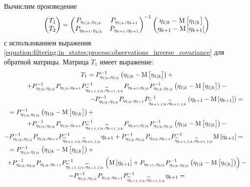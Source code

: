 Вычислим произведение
$$
	\begin{pmatrix}
		T_1 \\
		T_2
	\end{pmatrix}
	=
	\begin{pmatrix}
		P_{\eta_{1|k}, \eta_{1|k}} & P_{\eta_{1|k}, \eta_{k+1}} \\
		P_{\eta_{k+1}, \eta_{1|k}} & P_{\eta_{k+1}, \eta_{k+1}}
	\end{pmatrix}^{-1}
	\begin{pmatrix}
		\eta_{1|k} - \mathrm{M} \left [ \eta_{1|k} \right ] \\
		\eta_{k+1} - \mathrm{M} \left [ \eta_{k+1} \right ]
	\end{pmatrix}
$$
с использованием выражения \eqref{equation:filtering:in_states:process:observations_inverse_covariance} для обратной матрицы. Матрица $T_1$ имеет выражение:
\begin{multline*}
	T_1 = P_{\eta_{1|k},\eta_{1|k}}^{-1} \centered{\eta_{1|k}} + \\
		+ P_{\eta_{1|k},\eta_{1|k}}^{-1} P_{\eta_{1|k}, \eta_{k+1}} P_{\widetilde{\eta}_{k+1, 1|k}, \widetilde{\eta}_{k+1, 1|k}}^{-1} P_{\eta_{k+1}, \eta_{1|k}} P_{\eta_{1|k},\eta_{1|k}}^{-1} \centered{\eta_{1|k}} - \\
		\shoveright{ - P_{\eta_{1|k},\eta_{1|k}}^{-1} P_{\eta_{1|k}, \eta_{k+1}} P_{\widetilde{\eta}_{k+1, 1|k}, \widetilde{\eta}_{k+1, 1|k}}^{-1} \centered{\eta_{k+1}} = } \\
	\shoveleft{ = P_{\eta_{1|k},\eta_{1|k}}^{-1} \centered{\eta_{1|k}} + } \\
		+ P_{\eta_{1|k},\eta_{1|k}}^{-1} P_{\eta_{1|k}, \eta_{k+1}} P_{\widetilde{\eta}_{k+1, 1|k}, \widetilde{\eta}_{k+1, 1|k}}^{-1} P_{\eta_{k+1}, \eta_{1|k}} P_{\eta_{1|k},\eta_{1|k}}^{-1} \centered{\eta_{1|k}} - \\
		\shoveright{ - P_{\eta_{1|k},\eta_{1|k}}^{-1} P_{\eta_{1|k}, \eta_{k+1}} P_{\widetilde{\eta}_{k+1, 1|k}, \widetilde{\eta}_{k+1, 1|k}}^{-1} \eta_{k+1} + P_{\eta_{1|k},\eta_{1|k}}^{-1} P_{\eta_{1|k}, \eta_{k+1}} P_{\widetilde{\eta}_{k+1, 1|k}, \widetilde{\eta}_{k+1, 1|k}}^{-1} \expectation{\eta_{k+1}} = } \\
	\shoveleft{	= P_{\eta_{1|k},\eta_{1|k}}^{-1} \centered{\eta_{1|k}} + } \\
		+ P_{\eta_{1|k},\eta_{1|k}}^{-1} P_{\eta_{1|k}, \eta_{k+1}} P_{\widetilde{\eta}_{k+1, 1|k}, \widetilde{\eta}_{k+1, 1|k}}^{-1} \left ( \expectation{\eta_{k+1}} + P_{\eta_{k+1}, \eta_{1|k}} P_{\eta_{1|k},\eta_{1|k}}^{-1} \centered{\eta_{1|k}} \right ) - \\
		- P_{\eta_{1|k},\eta_{1|k}}^{-1} P_{\eta_{1|k}, \eta_{k+1}} P_{\widetilde{\eta}_{k+1, 1|k}, \widetilde{\eta}_{k+1, 1|k}}^{-1} \eta_{k+1} =
\end{multline*}
